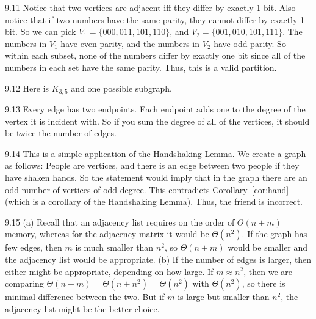 \begin{RequAnswer}{9.11}
Notice that two vertices are adjacent iff they differ by exactly 1 bit.
Also notice that if two numbers have the same parity, they cannot differ by exactly 1 bit.
So we can pick $V_1=\{000,011,101,110\}$, and $V_2=\{001,010,101,111\}$.
The numbers in $V_1$ have even parity, and the numbers in $V_2$ have odd parity.
So within each subset, none of the numbers differ by exactly one bit since all of the numbers in each
set have the same parity. Thus, this is a valid partition.
\end{RequAnswer}
\begin{RequAnswer}{9.12}
Here is $K_{3,5}$ and one possible subgraph.

\end{RequAnswer}
\begin{RequAnswer}{9.13}
Every edge has two endpoints.
Each endpoint adds one to the degree of the vertex it is incident with.
So if you sum the degree of all of the vertices, it should be twice the number of edges.
\end{RequAnswer}
\begin{RequAnswer}{9.14}
This is a simple application of the Handshaking Lemma.
We create a graph as follows:
People are vertices, and there is an edge between two people if they have shaken hands.
So the statement would imply that in the graph there are an odd number of vertices of odd degree.
This contradicts Corollary~\ref{cor:hand} (which is a corollary of the Handshaking Lemma).
Thus, the friend is incorrect.
\end{RequAnswer}
\begin{RequAnswer}{9.15}
(a) Recall that an adjacency list requires on the order of $\Theta(n+m)$ memory, whereas for the
adjacency matrix it would be $\Theta(n^2)$.
If the graph has few edges, then $m$ is much smaller than $n^2$, so $\Theta(n+m)$ would be smaller
and the adjacency list would be appropriate.
(b) If the number of edges is larger, then either might be appropriate, depending on how large. If
$m\approx n^2$, then we are comparing $\Theta(n+m)=\Theta(n+n^2)=\Theta(n^2)$ with $\Theta(n^2)$,
so there is minimal difference between the two. But if $m$ is large but smaller than $n^2$, the adjacency list
might be the better choice.
\end{RequAnswer}
